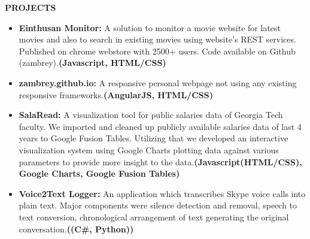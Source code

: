 \documentclass[a4paper]{article}
\newcommand{\resumesection}[1]{
	\vspace*{-0.5\baselineskip}
	\begin{flushleft}
		\large{\textbf{\uppercase{#1}}}
	\end{flushleft}
} %
\newcommand{\project}[3]{\item \textbf{#1:} #2\textbf{(#3)}} %
\begin{document}
\resumesection{Projects}
\begin{itemize}
	\project{Einthusan Monitor}{A solution to monitor a movie website for latest movies and also to search in existing movies using website's REST services. Published on chrome webstore with 2500+ users. Code available on Github (zambrey).}{Javascript, HTML/CSS}
	\project{zambrey.github.io}{A responsive personal webpage not using any existing responsive frameworks.}{AngularJS, HTML/CSS}
	\project{SalaRead}{A visualization tool for public salaries data of Georgia Tech faculty. We imported and cleaned up publicly available salaries data of last 4 years to Google Fusion Tables. Utilizing that we developed an interactive visualization system using Google Charts plotting data against various parameters to provide more insight to the data.}{Javascript(HTML/CSS), Google Charts, Google Fusion Tables}
	\project{Voice2Text Logger}{An application which transcribes Skype voice calls into plain text. Major components were silence detection and removal, speech to text conversion, chronological arrangement of text generating the original conversation.}{(C\#, Python)}
\end{itemize}
\end{document}
